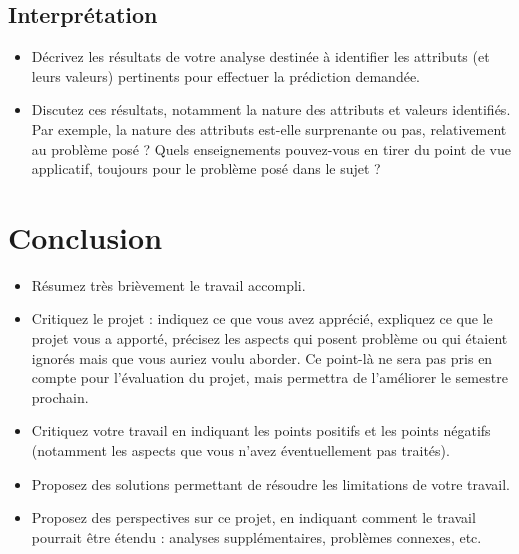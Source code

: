 \documentclass{ceri/sty/rapport}
\begin{document}
\subsection{Interprétation}
\begin{itemize}
	\item Décrivez les résultats de votre analyse destinée à identifier les attributs (et leurs valeurs) pertinents pour effectuer la prédiction demandée.
	\item Discutez ces résultats, notamment la nature des attributs et valeurs identifiés. Par exemple, la nature des attributs est-elle surprenante ou pas, relativement au problème posé ? Quels enseignements pouvez-vous en tirer du point de vue applicatif, toujours pour le problème posé dans le sujet ?
\end{itemize}

















\section{Conclusion}
\begin{itemize}
	\item Résumez très brièvement le travail accompli.
	\item Critiquez le projet : indiquez ce que vous avez apprécié, expliquez ce que le projet vous a apporté, précisez les aspects qui posent problème ou qui étaient ignorés mais que vous auriez voulu aborder. Ce point-là ne sera pas pris en compte pour l'évaluation du projet, mais permettra de l'améliorer le semestre prochain.
	\item Critiquez votre travail en indiquant les points positifs et les points négatifs (notamment les aspects que vous n'avez éventuellement pas traités).
	\item Proposez des solutions permettant de résoudre les limitations de votre travail.
	\item Proposez des perspectives sur ce projet, en indiquant comment le travail pourrait être étendu : analyses supplémentaires, problèmes connexes, etc.
\end{itemize}
\end{document}
